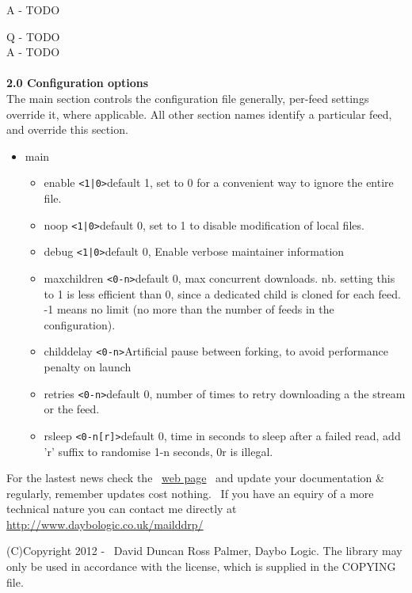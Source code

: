 \documentclass{article}
\begin{document}
A - TODO

\par Q - TODO
\\
A - TODO
\\
\\
\textbf{2.0 Configuration options}
\\
The main section controls the configuration file generally, per-feed settings override it,
where applicable.  All other section names identify a particular feed, and override this section.
\begin{itemize} %
\item main %
\begin{itemize}
\item enable \verb=<1|0>=\newline default 1, set to 0 for a convenient way to ignore the entire file.
\\
\item noop \verb=<1|0>=\newline default 0, set to 1 to disable modification of local files.
\\
\item debug \verb=<1|0>=\newline default 0, Enable verbose maintainer information
\\
\item maxchildren \verb=<0-n>=\newline default 0, max concurrent downloads. nb. setting this to 1
is less efficient than 0, since a dedicated child is cloned for each feed.
-1 means no limit (no more than the number of feeds in the configuration).
\\
\item childdelay \verb=<0-n>=\newline Artificial pause between forking, to avoid performance penalty on launch
\\
\item retries \verb=<0-n>=\newline default 0, number of times to retry downloading a the stream or the feed.
\\
\item rsleep \verb=<0-n[r]>=\newline default 0, time in seconds to sleep after a failed read, add 'r' suffix
to randomise 1-n seconds, 0r is illegal.
\end{itemize} %
\end{itemize} %

\par For the lastest news check the~ \href{http://bitbucket.org/daybologic/dlpodget}{web
page}~ and update your documentation \& regularly,
remember
updates cost nothing.~ If you have an equiry of a more technical
nature
you can contact me directly at \href{http://www.daybologic.co.uk/mailddrp/}{\url{http://www.daybologic.co.uk/mailddrp/}}\href{mailto:palmer@overchat.org}{}


\par (C)Copyright 2012 -
\the\year
~David Duncan Ross Palmer, Daybo Logic. The library may only be used in accordance
with
the license, which is supplied in the COPYING file.\\
\end{document}

